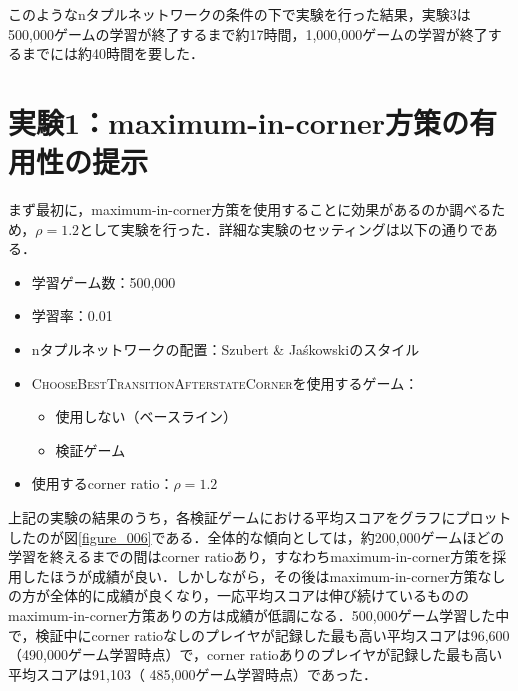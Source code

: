 \documentclass{suribt}
\begin{document}
このようなnタプルネットワークの条件の下で実験を行った結果，実験3は500,000ゲームの学習が終了するまで約17時間，1,000,000ゲームの学習が終了するまでには約40時間を要した．

\section{実験1：maximum-in-corner方策の有用性の提示}
まず最初に，maximum-in-corner方策を使用することに効果があるのか調べるため，${\rho}=1.2$として実験を行った．詳細な実験のセッティングは以下の通りである．

\begin{itemize}
\item 学習ゲーム数：500,000
\item 学習率：0.01
\item nタプルネットワークの配置：Szubert \& Ja\'{s}kowskiのスタイル
\item \textsc{ChooseBestTransitionAfterstateCorner}を使用するゲーム：
\begin{itemize}
\item 使用しない（ベースライン）
\item 検証ゲーム
\end{itemize}
\item 使用するcorner ratio：${\rho}=1.2$
\end{itemize}

上記の実験の結果のうち，各検証ゲームにおける平均スコアをグラフにプロットしたのが図\ref{figure_006}である．全体的な傾向としては，約200,000ゲームほどの学習を終えるまでの間はcorner ratioあり，すなわちmaximum-in-corner方策を採用したほうが成績が良い．しかしながら，その後はmaximum-in-corner方策なしの方が全体的に成績が良くなり，一応平均スコアは伸び続けているもののmaximum-in-corner方策ありの方は成績が低調になる．500,000ゲーム学習した中で，検証中にcorner ratioなしのプレイヤが記録した最も高い平均スコアは96,600（490,000ゲーム学習時点）で，corner ratioありのプレイヤが記録した最も高い平均スコアは91,103（
485,000ゲーム学習時点）であった．
\end{document}
